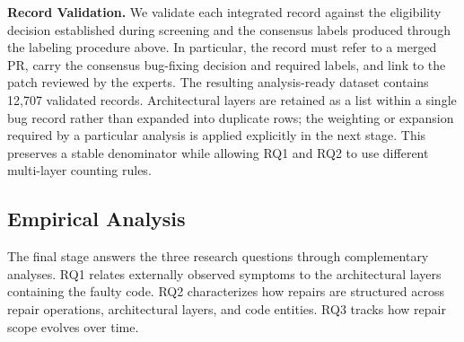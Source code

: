 \textbf{Record Validation.} We validate each integrated record against the eligibility decision established during screening and the consensus labels produced through the labeling procedure above. In particular, the record must refer to a merged PR, carry the consensus bug-fixing decision and required labels, and link to the patch reviewed by the experts. The resulting analysis-ready dataset contains 12,707 validated records. Architectural layers are retained as a list within a single bug record rather than expanded into duplicate rows; the weighting or expansion required by a particular analysis is applied explicitly in the next stage. This preserves a stable denominator while allowing RQ1 and RQ2 to use different multi-layer counting rules.



\subsection{Empirical Analysis}

The final stage answers the three research questions through complementary analyses. RQ1 relates externally observed symptoms to the architectural layers containing the faulty code. RQ2 characterizes how repairs are structured across repair operations, architectural layers, and code entities. RQ3 tracks how repair scope evolves over time.

